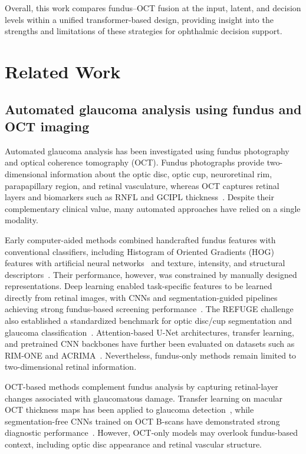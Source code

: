 \documentclass{ieeeaccess}
\begin{document}
Overall, this work compares fundus--OCT fusion at the input, latent, and decision levels within a unified transformer-based design, providing insight into the strengths and limitations of these strategies for ophthalmic decision support.

\section{Related Work}
\label{sec:related_work}

\subsection{Automated glaucoma analysis using fundus and OCT imaging}
\label{subsec:fundus_oct_glaucoma_analysis}

Automated glaucoma analysis has been investigated using fundus photography and optical coherence tomography (OCT). Fundus photographs provide two-dimensional information about the optic disc, optic cup, neuroretinal rim, parapapillary region, and retinal vasculature, whereas OCT captures retinal layers and biomarkers such as RNFL and GCIPL thickness~\cite{kanski10,jayaram2023glaucoma}. Despite their complementary clinical value, many automated approaches have relied on a single modality.

Early computer-aided methods combined handcrafted fundus features with conventional classifiers, including Histogram of Oriented Gradients (HOG) features with artificial neural networks~\cite{singh2022hog} and texture, intensity, and structural descriptors~\cite{velpula2024automated,pathan2023automated}. Their performance, however, was constrained by manually designed representations. Deep learning enabled task-specific features to be learned directly from retinal images, with CNNs and segmentation-guided pipelines achieving strong fundus-based screening performance~\cite{cho2021deep,shyamalee2022attention}. The REFUGE challenge also established a standardized benchmark for optic disc/cup segmentation and glaucoma classification~\cite{orlando2020refuge}. Attention-based U-Net architectures, transfer learning, and pretrained CNN backbones have further been evaluated on datasets such as RIM-ONE and ACRIMA~\cite{shyamalee2022glaucoma,diaz2019cnns,shyamalee2022cnn}. Nevertheless, fundus-only methods remain limited to two-dimensional retinal information.

OCT-based methods complement fundus analysis by capturing retinal-layer changes associated with glaucomatous damage. Transfer learning on macular OCT thickness maps has been applied to glaucoma detection~\cite{asaoka2019using}, while segmentation-free CNNs trained on OCT B-scans have demonstrated strong diagnostic performance~\cite{thompson2020assessment}. However, OCT-only models may overlook fundus-based context, including optic disc appearance and retinal vascular structure.
\end{document}
